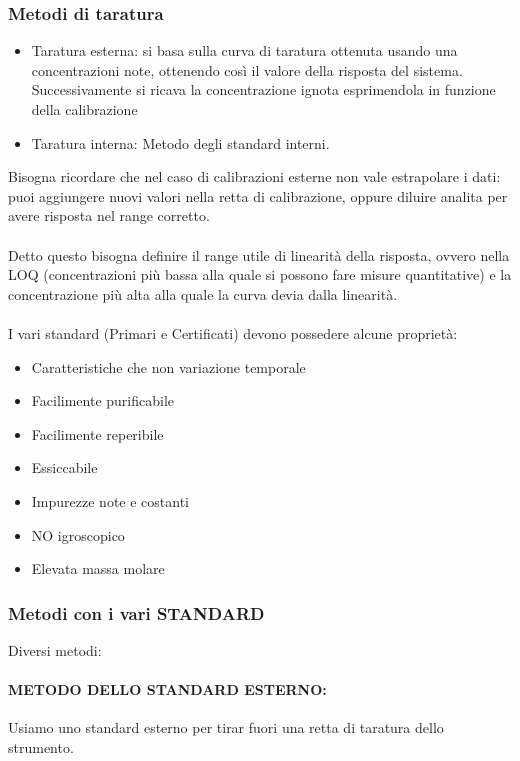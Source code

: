 \documentclass{article}
\begin{document}
\subsubsection{Metodi di taratura}
\begin{itemize}
	\item Taratura esterna: si basa sulla curva di taratura ottenuta usando una concentrazioni note, ottenendo così il valore della risposta del sistema. Successivamente si ricava la concentrazione ignota esprimendola in funzione della calibrazione
	\item Taratura interna: Metodo degli standard interni.
\end{itemize}
%
Bisogna ricordare che nel caso di calibrazioni esterne non vale estrapolare i dati: puoi aggiungere nuovi valori nella retta di calibrazione, oppure diluire analita per avere risposta nel range corretto.
\\\\
Detto questo bisogna definire il range utile di linearità della risposta, ovvero nella LOQ (concentrazioni più bassa alla quale si possono fare misure quantitative) e la concentrazione più alta alla quale la curva devia dalla linearità.
\\\\
I vari standard (Primari e Certificati) devono possedere alcune proprietà:
\begin{itemize}
	\item Caratteristiche che non variazione temporale
	\item Facilimente purificabile
	\item Facilimente reperibile
	\item Essiccabile
	\item Impurezze note e costanti
	\item NO igroscopico
	\item Elevata massa molare
\end{itemize}

\newpage

\subsubsection{Metodi con i vari STANDARD}
Diversi metodi:

\paragraph{METODO DELLO STANDARD ESTERNO:} Usiamo uno standard esterno per tirar fuori una retta di taratura dello strumento.
\end{document}
